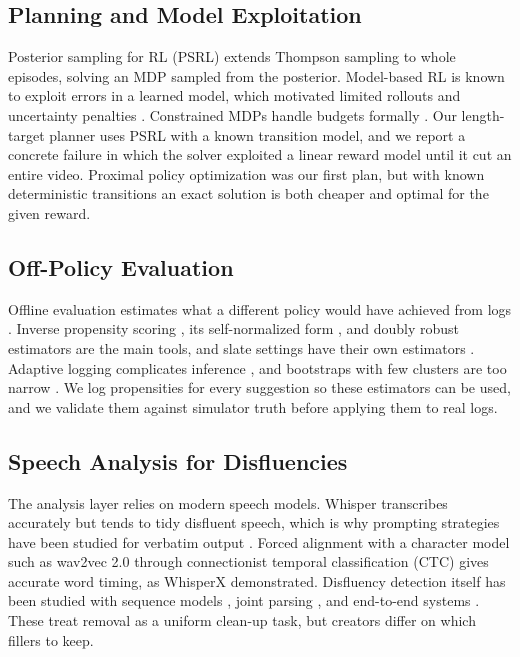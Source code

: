 \documentclass{ieeeaccess}
\begin{document}
\subsection{Planning and Model Exploitation}
Posterior sampling for RL (PSRL) \cite{osband2013} extends Thompson sampling to whole episodes, solving an MDP sampled from the posterior. Model-based RL is known to exploit errors in a learned model, which motivated limited rollouts \cite{janner2019} and uncertainty penalties \cite{yu2020}. Constrained MDPs handle budgets formally \cite{altman1999}. Our length-target planner uses PSRL with a known transition model, and we report a concrete failure in which the solver exploited a linear reward model until it cut an entire video. Proximal policy optimization \cite{schulman2017} was our first plan, but with known deterministic transitions an exact solution is both cheaper and optimal for the given reward.

\subsection{Off-Policy Evaluation}
Offline evaluation estimates what a different policy would have achieved from logs \cite{li2011,saito2021}. Inverse propensity scoring \cite{horvitz1952}, its self-normalized form \cite{swaminathan2015}, and doubly robust estimators \cite{dudik2011} are the main tools, and slate settings have their own estimators \cite{swaminathan2017}. Adaptive logging complicates inference \cite{hadad2021}, and bootstraps with few clusters are too narrow \cite{cameron2008}. We log propensities for every suggestion so these estimators can be used, and we validate them against simulator truth before applying them to real logs.

\subsection{Speech Analysis for Disfluencies}
The analysis layer relies on modern speech models. Whisper \cite{radford2023} transcribes accurately but tends to tidy disfluent speech, which is why prompting strategies have been studied for verbatim output \cite{smith2025}. Forced alignment with a character model such as wav2vec 2.0 \cite{baevski2020} through connectionist temporal classification (CTC) \cite{graves2006} gives accurate word timing, as WhisperX \cite{bain2023} demonstrated. Disfluency detection itself has been studied with sequence models \cite{zayats2016}, joint parsing \cite{honnibal2014}, and end-to-end systems \cite{lou2020}. These treat removal as a uniform clean-up task, but creators differ on which fillers to keep.
\end{document}
